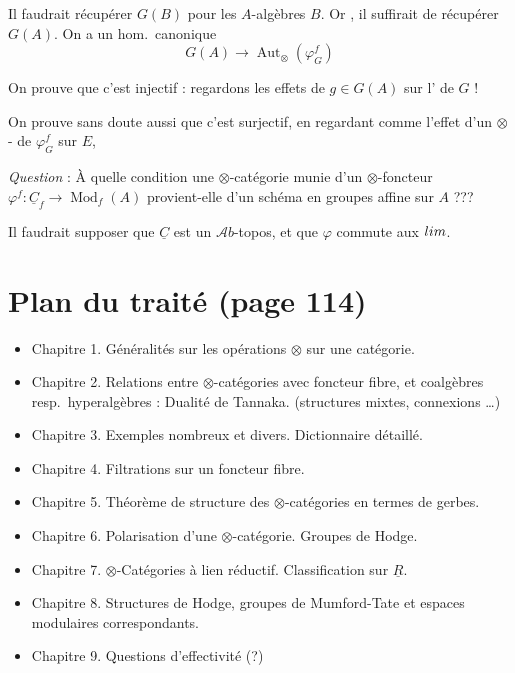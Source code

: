 \documentclass[11pt,a4paper]{article}
\begin{document}
Il faudrait récupérer $G(B)$ pour les $A$-algèbres $B$. Or \ill{}, il
suffirait de récupérer $G(A)$. On a un hom.\ canonique
\[
G(A) \longrightarrow \operatorname{Aut}_{\otimes}(\varphi_{G}^{f})
\]
\struck{\ill{}}

On prouve que c'est injectif : regardons les effets de $g \in G(A)$ sur
l'  de $G$ !

On prouve sans doute aussi que c'est surjectif, en regardant comme l'effet
d'un $\otimes$-\ill{} \ill{} de $\varphi_{G}^{f}$ sur $E$,
\struck{\ill{}} 

\struck{\ill{}}

\emph{Question} : À quelle condition une $\otimes$-catégorie
 munie d'un $\otimes$-foncteur
$\varphi^{f} : \underline{C}_{f} \to \operatorname{Mod}_{f}(A)$ provient-elle
d'un schéma en groupes affine sur $A$ ???

Il faudrait supposer que $\underline{C}$ est un $\mathcal{A}b$-topos, et que
$\varphi$ commute aux $\varinjlim$.

\section*{Plan du traité (page 114)}


\begin{itemize}
\item Chapitre 1. Généralités sur les opérations $\otimes$ sur une catégorie.
\item Chapitre 2. Relations entre $\otimes$-catégories  avec
  foncteur fibre, et coalgèbres resp.\ hyperalgèbres :  Dualité
  de Tannaka. (structures mixtes, connexions …)
\item Chapitre 3. Exemples nombreux et divers. Dictionnaire détaillé.
\item Chapitre 4. Filtrations sur un foncteur fibre.
\item Chapitre 5. Théorème de structure des $\otimes$-catégories en termes de
  gerbes.
\item Chapitre 6. Polarisation d'une $\otimes$-catégorie. Groupes de Hodge.
\item Chapitre 7. $\otimes$-Catégories à lien réductif. Classification sur
  $\underline{R}$.
\item Chapitre 8. Structures de Hodge, groupes de Mumford-Tate et espaces
  modulaires correspondants.
\item Chapitre 9. Questions d'effectivité (?)
\end{itemize}
\end{document}
